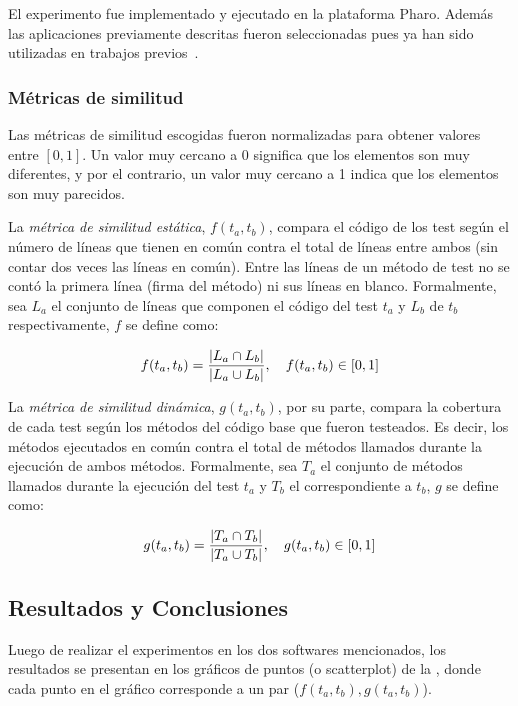 \par El experimento fue implementado y ejecutado en la plataforma Pharo. Además las aplicaciones previamente descritas fueron seleccionadas pues ya han sido utilizadas en trabajos previos~\cite{Berg11d}.

\subsubsection{Métricas de similitud}
\par Las métricas de similitud escogidas fueron normalizadas para obtener valores entre $\left[ 0 , 1 \right]$. Un valor muy cercano a $0$ significa que los elementos son muy diferentes, y por el contrario, un valor muy cercano a 1 indica que los elementos son muy parecidos. 

\par La \emph{métrica de similitud estática}, $f(t_a,t_b)$, compara el código de los test según el número de líneas que tienen en común contra el total de líneas entre ambos (sin contar dos veces las líneas en común). Entre las líneas de un método de test no se contó la primera línea (firma del método) ni sus líneas en blanco. Formalmente, sea $L_{a}$ el conjunto de líneas que componen el código del test $t_a$ y  $L_{b}$ de $t_b$ respectivamente, $f$ se define como: 

\[ f(t_a,t_b)= \dfrac{\vert L_{a} \cap L_{b} \vert}{\vert L_{a} \cup L_{b} \vert} , \quad f(t_a,t_b) \in \left[ 0 , 1 \right] \]

\par La \emph{métrica de similitud dinámica}, $g(t_a,t_b)$, por su parte, compara la cobertura de cada test según los métodos del código base que fueron testeados. Es decir, los métodos ejecutados en común contra el total de métodos llamados durante la ejecución de ambos métodos. Formalmente, sea $T_{a}$ el conjunto de métodos llamados durante la ejecución del test $t_a$ y $T_{b}$ el correspondiente a $t_b$, $g$ se define como: 

\[ g(t_a,t_b)= \dfrac{\vert T_{a} \cap T_{b} \vert}{\vert T_{a} \cup T_{b} \vert} , \quad g(t_a,t_b) \in \left[ 0 , 1 \right] \]


\subsection{Resultados y Conclusiones}

\par Luego de realizar el experimentos en los dos softwares mencionados, los resultados se presentan en los gráficos de puntos (o scatterplot) de la , donde cada punto en el gráfico corresponde a un par ($f(t_a,t_b),g(t_a,t_b)$).

